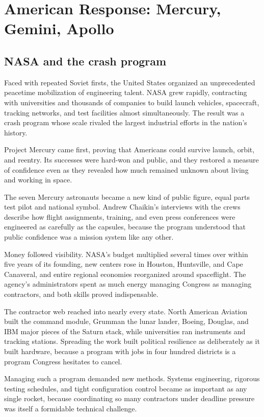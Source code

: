 \section{American Response: Mercury, Gemini, Apollo}

\subsection{NASA and the crash program}
Faced with repeated Soviet firsts, the United States organized an unprecedented peacetime mobilization of engineering talent. NASA grew rapidly, contracting with universities and thousands of companies to build launch vehicles, spacecraft, tracking networks, and test facilities almost simultaneously. The result was a crash program whose scale rivaled the largest industrial efforts in the nation's history.

Project Mercury came first, proving that Americans could survive launch, orbit, and reentry. Its successes were hard-won and public, and they restored a measure of confidence even as they revealed how much remained unknown about living and working in space.

The seven Mercury astronauts became a new kind of public figure, equal parts test pilot and national symbol. Andrew Chaikin's interviews with the crews describe how flight assignments, training, and even press conferences were engineered as carefully as the capsules, because the program understood that public confidence was a mission system like any other.

Money followed visibility. NASA's budget multiplied several times over within five years of its founding, new centers rose in Houston, Huntsville, and Cape Canaveral, and entire regional economies reorganized around spaceflight. The agency's administrators spent as much energy managing Congress as managing contractors, and both skills proved indispensable.

The contractor web reached into nearly every state. North American Aviation built the command module, Grumman the lunar lander, Boeing, Douglas, and IBM major pieces of the Saturn stack, while universities ran instruments and tracking stations. Spreading the work built political resilience as deliberately as it built hardware, because a program with jobs in four hundred districts is a program Congress hesitates to cancel.

Managing such a program demanded new methods. Systems engineering, rigorous testing schedules, and tight configuration control became as important as any single rocket, because coordinating so many contractors under deadline pressure was itself a formidable technical challenge. \cite{logsdon2010} \cite{chaikin1994} \cite{nasa2019}

